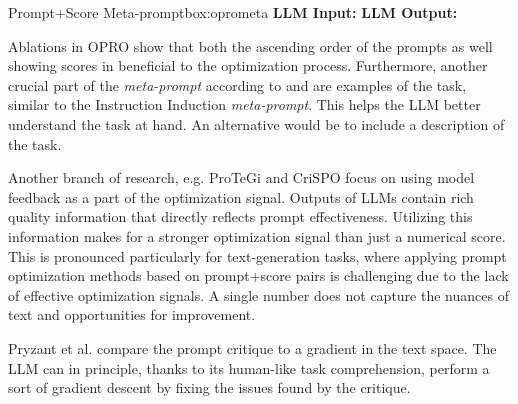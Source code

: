 \begin{figurebox}{Prompt+Score Meta-prompt}{box:oprometa}
    \textbf{LLM Input:} 
    \textbf{LLM Output:}
\end{figurebox}
\newpage
Ablations in OPRO\cite{yang2024largelanguagemodelsoptimizers} show that both the ascending order of the prompts
as well showing scores in beneficial to the optimization process. Furthermore, another crucial part
of the \textit{meta-prompt} according to \cite{yang2024largelanguagemodelsoptimizers} and \cite{tang2024unleashingpotentiallargelanguage} are examples of the task, similar to the
Instruction Induction \textit{meta-prompt}. This helps the LLM better understand the task at hand. An alternative would be to include a description of the task\cite{he2024crispomultiaspectcritiquesuggestionguidedautomatic}.

Another branch of research, e.g. ProTeGi\cite{pryzant2023automaticpromptoptimizationgradient} and CriSPO\cite{he2024crispomultiaspectcritiquesuggestionguidedautomatic}
focus on using model feedback as a part of the optimization signal. Outputs of LLMs contain rich quality 
information that directly reflects prompt effectiveness\cite{xiang2025selfsupervisedpromptoptimization}. 
Utilizing this information makes for a stronger optimization signal than just a numerical score.
This is pronounced particularly for text-generation tasks, where applying prompt optimization methods based on prompt+score pairs 
is challenging due to the lack of effective optimization signals\cite{he2024crispomultiaspectcritiquesuggestionguidedautomatic}.
A single number does not capture the nuances of text and opportunities for improvement. 

Pryzant et al.\cite{pryzant2023automaticpromptoptimizationgradient}
compare the prompt critique to a gradient in the text space. The LLM can in principle, thanks to its human-like task comprehension\cite{xiang2025selfsupervisedpromptoptimization},
perform a sort of gradient descent by fixing the issues found by the critique. 

